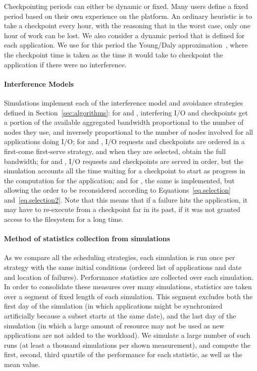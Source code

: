 Checkpointing periods can either be dynamic or fixed. Many users
define a fixed period based on their own experience on the
platform. An ordinary heuristic is to take a checkpoint every hour,
with the reasoning that in the worst case, only one hour of work can
be lost. We also consider a dynamic period that is defined for each
application. We use for this period the Young/Daly
approximation~\cite{young74,daly04}, where the checkpoint time is
taken as the time it would take to checkpoint the application if there
were no interference.

\paragraph*{Interference Models} Simulations implement each of the
interference model and avoidance strategies defined in
Section~\ref{sec:algorithms}: for \propfixed and \propdaly,
interfering I/O and checkpoints get a portion of the available
aggregated bandwidth proportional to the number of nodes they use, and
inversely proportional to the number of nodes involved for all
applications doing I/O; for \bfifofixed and \bfifodaly, I/O requests
and checkpoints are ordered in a first-come first-serve strategy, and
when they are selected, obtain the full bandwidth; for \fifofixed and
\fifodaly, I/O requests and checkpoints are served in order, but the
simulation accounts all the time waiting for a checkpoint to start as
progress in the computation for the application; and for \cooperative,
the same is implemented, but allowing the order to be reconsidered
according to Equations~\ref{eq.selection} and~\ref{eq.selection2}.
Note that this means that if a failure hits the application, it may
have to re-execute from a checkpoint far in its past, if it was not
granted access to the filesystem for a long time.

\paragraph*{Method of statistics collection from simulations}
As we compare all the scheduling strategies, each simulation is run
once per strategy with the same initial conditions (ordered list of
applications and date and location of failures). Performance
statistics are collected over each simulation. In order to consolidate
these measures over many simulations, statistics are taken over a
segment of fixed length of each simulation. This segment excludes both
the first day of the simulation (in which applications might be
synchronized artificially because a subset starts at the same date),
and the last day of the simulation (in which a large amount of
resource may not be used as new applications are not added to the
workload). We simulate a large number of such runs (at least a
thousand simulations per shown measurement), and compute the first,
second, third quartile of the performance for each statistic, as well
as the mean value.
